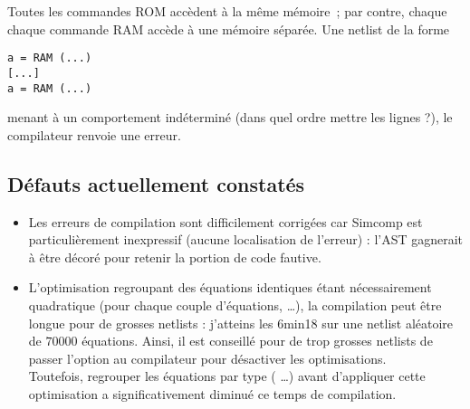 \documentclass[11pt,a4paper]{article}
\begin{document}
Toutes les commandes ROM accèdent à la même mémoire~; par contre, chaque chaque commande RAM accède à une mémoire séparée. Une netlist de la forme
\begin{lstlisting}
a = RAM (...)
[...]
a = RAM (...)
\end{lstlisting}
menant à un comportement indéterminé (dans quel ordre mettre les lignes ?), le compilateur renvoie une erreur.

\subsection{Défauts actuellement constatés}

\begin{itemize}
\item Les erreurs de compilation sont difficilement corrigées car Simcomp est particulièrement inexpressif (aucune localisation de l'erreur) : l'AST gagnerait à être décoré pour retenir la portion de code fautive.
\item L'optimisation regroupant des équations identiques étant nécessairement quadratique (pour chaque couple d'équations, \ldots), la compilation peut être longue pour de grosses netlists : j'atteins les 6min18 sur une netlist aléatoire de $70 000$ équations. Ainsi, il est conseillé pour de trop grosses netlists de passer l'option  au compilateur pour désactiver les optimisations.\\
Toutefois, regrouper les équations par type ( \ldots) avant d'appliquer cette optimisation a significativement diminué ce temps de compilation.
\end{itemize}
\end{document}
